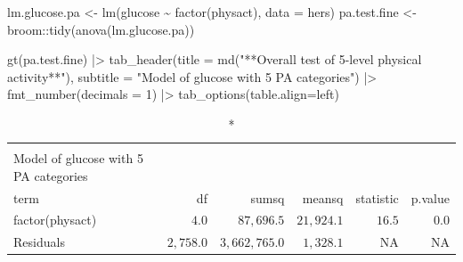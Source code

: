 \documentclass[
  letterpaper,
  DIV=11,
  numbers=noendperiod]{scrreport}
\newenvironment{Shaded}{\begin{snugshade}}{\end{snugshade}}
\newcommand{\AttributeTok}[1]{\textcolor[rgb]{0.40,0.45,0.13}{#1}}
\newcommand{\DecValTok}[1]{\textcolor[rgb]{0.68,0.00,0.00}{#1}}
\newcommand{\FunctionTok}[1]{\textcolor[rgb]{0.28,0.35,0.67}{#1}}
\newcommand{\NormalTok}[1]{\textcolor[rgb]{0.00,0.23,0.31}{#1}}
\newcommand{\OtherTok}[1]{\textcolor[rgb]{0.00,0.23,0.31}{#1}}
\newcommand{\SpecialCharTok}[1]{\textcolor[rgb]{0.37,0.37,0.37}{#1}}
\newcommand{\StringTok}[1]{\textcolor[rgb]{0.13,0.47,0.30}{#1}}
\begin{document}
\begin{Shaded}
\begin{Highlighting}[]
\NormalTok{lm.glucose.pa }\OtherTok{\textless{}{-}} \FunctionTok{lm}\NormalTok{(glucose }\SpecialCharTok{\textasciitilde{}} \FunctionTok{factor}\NormalTok{(physact), }\AttributeTok{data =}\NormalTok{ hers)}
\NormalTok{pa.test.fine }\OtherTok{\textless{}{-}}\NormalTok{ broom}\SpecialCharTok{::}\FunctionTok{tidy}\NormalTok{(}\FunctionTok{anova}\NormalTok{(lm.glucose.pa))}

\FunctionTok{gt}\NormalTok{(pa.test.fine) }\SpecialCharTok{|\textgreater{}} 
   \FunctionTok{tab\_header}\NormalTok{(}\AttributeTok{title =} 
               \FunctionTok{md}\NormalTok{(}\StringTok{"**Overall test of 5{-}level physical activity**"}\NormalTok{),}
                  \AttributeTok{subtitle =} \StringTok{"Model of glucose with 5 PA categories"}\NormalTok{) }\SpecialCharTok{|\textgreater{}} 
  \FunctionTok{fmt\_number}\NormalTok{(}\AttributeTok{decimals =} \DecValTok{1}\NormalTok{) }\SpecialCharTok{|\textgreater{}} 
  \FunctionTok{tab\_options}\NormalTok{(}\AttributeTok{table.align=}\StringTok{\textquotesingle{}left\textquotesingle{}}\NormalTok{)}
\end{Highlighting}
\end{Shaded}

\begin{longtable}{lrrrrr}
\caption*{
{\large \textbf{Overall test of 5-level physical activity}} \\ 
{\small Model of glucose with 5 PA categories}
} \\ 
\toprule
term & df & sumsq & meansq & statistic & p.value \\ 
\midrule
factor(physact) & $4.0$ & $87,696.5$ & $21,924.1$ & $16.5$ & $0.0$ \\ 
Residuals & $2,758.0$ & $3,662,765.0$ & $1,328.1$ & NA & NA \\ 
\bottomrule
\end{longtable}
\end{document}
